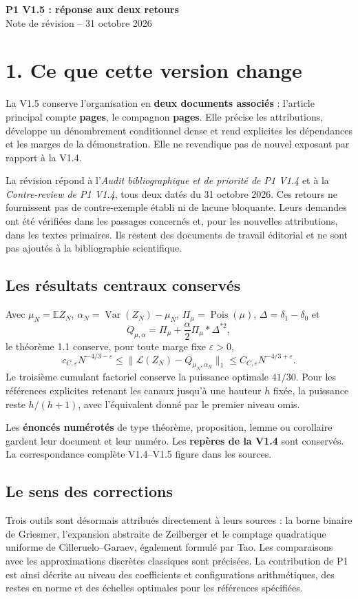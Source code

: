 \documentclass[11pt,a4paper]{article}
\newcommand{\E}{\mathbb E}
\newcommand{\Law}{\mathcal L}
\newcommand{\eps}{\varepsilon}
\begin{document}
{\Large\bfseries\color{accent} P1 V1.5 : réponse aux deux retours}\\[4pt]
{\large Note de révision -- 31 octobre 2026}

\section*{1. Ce que cette version change}
La V1.5 conserve l'organisation en \textbf{deux documents associés} :
l'article principal compte \textbf{\MainPageCount{} pages}, le compagnon
\textbf{\CompanionPageCount{} pages}. Elle précise les attributions,
développe un dénombrement conditionnel dense et rend explicites les
dépendances et les marges de la démonstration. Elle ne revendique pas
de nouvel exposant par rapport à la V1.4.

La révision répond à l'\emph{Audit bibliographique et de priorité de P1 V1.4}
et à la \emph{Contre-review de P1 V1.4}, tous deux datés du
31 octobre 2026. Ces retours ne fournissent pas de contre-exemple établi
ni de lacune bloquante. Leurs demandes ont été vérifiées dans les passages
concernés et, pour les nouvelles attributions, dans les textes primaires.
Ils restent des documents de travail éditorial et ne sont pas ajoutés à
la bibliographie scientifique.

\subsection*{Les résultats centraux conservés}
Avec \(\mu_N=\E Z_N\), \(\alpha_N=\operatorname{Var}(Z_N)-\mu_N\),
\(\Pi_\mu=\operatorname{Pois}(\mu)\), \(\Delta=\delta_1-\delta_0\) et
\[
 Q_{\mu,\alpha}=\Pi_\mu+\frac{\alpha}{2}\Pi_\mu*\Delta^{*2},
\]
le théorème 1.1 conserve, pour toute marge fixe \(\eps>0\),
\[
 c_{C,\eps}N^{-4/3-\eps}
 \le \|\Law(Z_N)-Q_{\mu_N,\alpha_N}\|_1
 \le C_{C,\eps}N^{-4/3+\eps}.
\]
Le troisième cumulant factoriel conserve la puissance optimale
\(41/30\). Pour les références explicites retenant les canaux jusqu'à
une hauteur \(h\) fixée, la puissance reste \(h/(h+1)\), avec
l'équivalent donné par le premier niveau omis.

Les \textbf{\NumberedResultCount{} énoncés numérotés} de type théorème,
proposition, lemme ou corollaire gardent leur document et leur numéro.
Les \textbf{\PreservedLabelCount{} repères de la V1.4} sont conservés.
La correspondance complète V1.4--V1.5 figure dans les sources.

\subsection*{Le sens des corrections}
Trois outils sont désormais attribués directement à leurs sources :
la borne binaire de Griesmer, l'expansion abstraite de Zeilberger et le
comptage quadratique uniforme de Cilleruelo--Garaev, également formulé
par Tao. Les comparaisons avec les approximations discrètes classiques
sont précisées. La contribution de P1 est ainsi décrite au niveau des
coefficients et configurations arithmétiques, des restes en norme et
des échelles optimales pour les références spécifiées.
\end{document}
